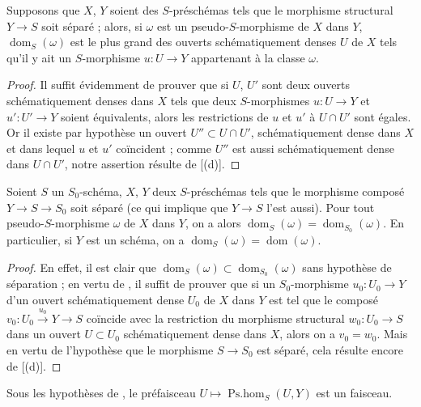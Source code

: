 \begin{proposition}[20.2.4]
\label{IV.20.2.4}
Supposons que $X$, $Y$ soient des $S$-préschémas tels que le morphisme structural $Y\to S$ soit séparé ; alors, si $\omega$ est un pseudo-$S$-morphisme de $X$ dans $Y$, $\operatorname{dom}_S(\omega)$ est le plus grand des ouverts schématiquement denses $U$ de $X$ tels qu'il y ait un $S$-morphisme $u:U\to Y$ appartenant à la classe $\omega$.
\end{proposition}

\begin{proof}
Il suffit évidemment de prouver que si $U$, $U'$ sont deux ouverts schématiquement denses dans $X$ tels que deux $S$-morphismes $u:U\to Y$ et $u':U'\to Y$ soient équivalents, alors les restrictions de $u$ et $u'$ à $U\cap U'$ sont égales.
Or il existe par hypothèse un ouvert $U''\subset U\cap U'$, schématiquement dense dans $X$ et dans lequel $u$ et $u'$ coïncident ; comme $U''$ est aussi schématiquement dense dans $U\cap U'$, notre assertion résulte de [(d)].
\end{proof}

\begin{corollary}[20.2.5]
\label{IV.20.2.5}
Soient $S$ un $S_0$-schéma, $X$, $Y$ deux $S$-préschémas tels que le morphisme composé $Y\to S\to S_0$ soit séparé (ce qui implique  que $Y\to S$ l'est aussi).
Pour tout pseudo-$S$-morphisme $\omega$ de $X$ dans $Y$, on a alors $\operatorname{dom}_S(\omega)=\operatorname{dom}_{S_0}(\omega)$.
En particulier, si $Y$ est un schéma, on a $\operatorname{dom}_S(\omega)=\operatorname{dom}(\omega)$.
\end{corollary}

\begin{proof}
En effet, il est clair que $\operatorname{dom}_S(\omega)\subset\operatorname{dom}_{S_0}(\omega)$ sans hypothèse de séparation ; en vertu de , il suffit de prouver que si un $S_0$-morphisme $u_0:U_0\to Y$ d'un ouvert
schématiquement dense $U_0$ de $X$ dans $Y$ est tel que le composé $v_0:U_0\xrightarrow{u_0}Y\to S$ coïncide avec la restriction du morphisme structural $w_0:U_0\to S$ dans un ouvert $U\subset U_0$ schématiquement dense dans $X$, alors on a $v_0=w_0$.
Mais en vertu de l'hypothèse que le morphisme $S\to S_0$ est séparé, cela résulte encore de [(d)].
\end{proof}

\begin{corollary}[20.2.6]
\label{IV.20.2.6}
Sous les hypothèses de , le préfaisceau $U\mapsto\operatorname{Ps.hom}_S(U,Y)$ est un faisceau.
\end{corollary}

